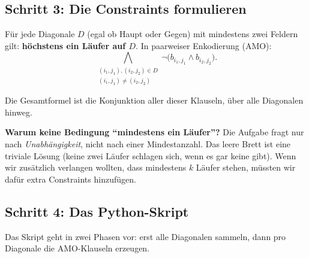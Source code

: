 \documentclass[a4paper,12pt]{article}
\begin{document}
\subsection*{Schritt 3: Die Constraints formulieren}

\begin{merkbox}[title={Bishop-Constraint}]
F\"ur jede Diagonale $D$ (egal ob Haupt oder Gegen) mit mindestens
zwei Feldern gilt: \textbf{h\"ochstens ein L\"aufer auf $D$}. In
paarweiser Enkodierung (AMO):
\[
\bigwedge_{\substack{(i_1,j_1), (i_2,j_2) \in D \\ (i_1,j_1) \neq (i_2,j_2)}}
\neg\bigl(b_{i_1,j_1} \wedge b_{i_2,j_2}\bigr).
\]
\end{merkbox}

Die Gesamtformel ist die Konjunktion aller dieser Klauseln, \"uber
alle Diagonalen hinweg.

\textbf{Warum keine Bedingung "`mindestens ein L\"aufer"'?} Die
Aufgabe fragt nur nach \emph{Unabh\"angigkeit}, nicht nach einer
Mindestanzahl. Das leere Brett ist eine triviale L\"osung (keine zwei
L\"aufer schlagen sich, wenn es gar keine gibt). Wenn wir zus\"atzlich
verlangen wollten, dass mindestens $k$ L\"aufer stehen, m\"ussten wir
daf\"ur extra Constraints hinzuf\"ugen.

\subsection*{Schritt 4: Das Python-Skript}

Das Skript geht in zwei Phasen vor: erst alle Diagonalen sammeln,
dann pro Diagonale die AMO-Klauseln erzeugen.
\end{document}
